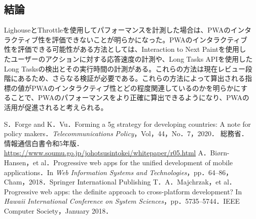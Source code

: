 \begin{multicols*}{2}
\subsection{結論}
LighouseとThrottleを使用してパフォーマンスを計測した場合は、PWAのインタラクティブ性を評価できないことが明らかになった。PWAのインタラクティブ性を評価できる可能性がある方法としては、Interaction to Next Paintを使用したユーザーのアクションに対する応答速度の計測や、Long Tasks APIを使用したLong Tasksの検出とその実行時間の計測がある。これらの方法は現在レビュー段階にあるため、さらなる検証が必要である。これらの方法によって算出される指標の値がPWAのインタラクティブ性とどの程度関連しているのかを明らかにすることで、PWAのパフォーマンスをより正確に算出できるようになり、PWAの活用が促進されると考えられる。

\begin{thebibliography}{9}
 S．Forge and K．Vu．Forming a 5g strategy for developing countries: A note for policy makers．\textit{Telecommunications Policy}，Vol，44，No．7，2020．
 総務省．情報通信白書令和5年版．\url{https://www.soumu.go.jp/johotsusintokei/whitepaper/r05.html}
 A．Biørn-Hansen，et al．Progressive web apps for the unified development of mobile applications．In \textit{Web Information Systems and Technologies}，pp．64–86，Cham，2018．Springer International Publishing
 T．A．Majchrzak，et al．Progressive web apps: the definite approach to cross-platform development? In \textit{Hawaii International Conference on System Sciences}，pp．5735–5744．IEEE Computer Society，January 2018．
\end{thebibliography}
\end{multicols*} 
